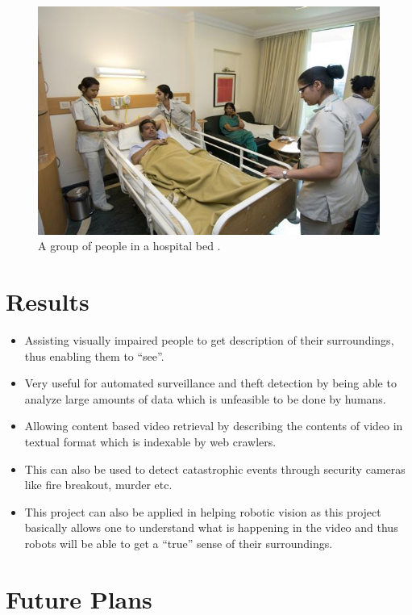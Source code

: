 \documentclass[11pt]{article}
\begin{document}
\begin{figure}[ht!]
			    	\centering
					\includegraphics[scale=0.266]{Hospital--621x414-k0SG--621x414@LiveMint.jpg}
					\caption{A group of people in a hospital bed . \label{fig14}}
\end{figure}
	\section{Results}
			\begin{itemize}
				\item
					Assisting visually impaired people to get description of their surroundings, thus enabling them to ``see''.
				\item
					Very useful for automated surveillance and theft detection by being able to analyze large amounts of data which is unfeasible to be done by humans.
				\item
					Allowing content based video retrieval by describing the contents of video in textual format which is indexable by web crawlers.
				\item
					This can also be used to detect catastrophic events through security cameras like fire breakout, murder etc.
				\item
					This project can also be applied in helping robotic vision as this project basically allows one to understand what is happening in the video and thus robots will be able to get a ``true'' sense of their surroundings.
			\end{itemize}

	\section{Future Plans}	
\end{document}
